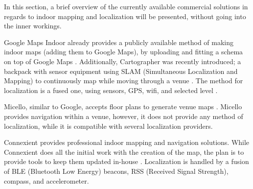 In this section, a brief overview of the currently available commercial solutions in regards to indoor mapping and localization will be presented, without going into the inner workings.

Google Maps Indoor already provides a publicly available method of making indoor maps (adding them to Google Maps), by uploading and fitting a schema on top of Google Maps \cite{google_maps_indoor}.
Additionally, Cartographer was recently introduced; a backpack with sensor equipment using SLAM (Simultaneous Localization and Mapping) to continuously map while moving through a venue \cite{cartographer}.
The method for localization is a fused one, using sensors, GPS, wifi, and selected level \cite[Slide 45]{indoor_maps_google_slides}.

Micello, similar to Google, accepts floor plans to generate venue maps \cite{micello}.
Micello provides navigation within a venue, however, it does not provide any method of localization, while it is compatible with several localization providers.

Connexient provides professional indoor mapping and navigation solutions.
While Connexient does all the initial work with the creation of the map, the plan is to provide tools to keep them updated in-house \cite{connexient_indoor_map}.
Localization is handled by a fusion of BLE (Bluetooth Low Energy) beacons, RSS (Received Signal Strength), compass, and accelerometer.
